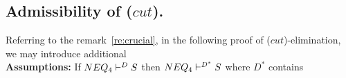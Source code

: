 
\subsection{Admissibility of ($cut$).}\label{sub:cut}
Referring to the remark~\ref{re:crucial}, 
in the following proof of ($cut$)-elimination, 
we may introduce additional
\\[1ex]
\noindent
{\bf Assumptions:} If ${NEQ_4}\vdash^{{D}}S$ then ${NEQ_4}\vdash^{{D^*}}S$ where $D^*$ contains 
\vspace*{1ex}

